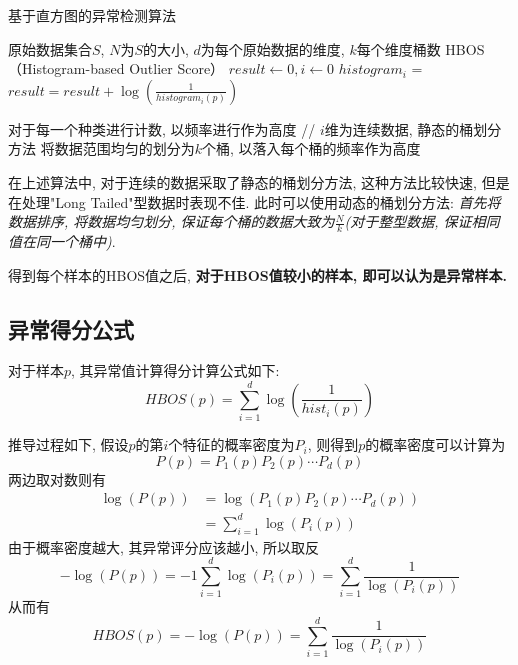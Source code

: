 \documentclass[12pt]{article}
\newcommand*{\heiti}{\CJKfamily{zhhei}}   %
\theoremstyle{definition}
\begin{document}
\begin{algorithm}[H]
  \caption{基于直方图的异常检测算法}
  \begin{algorithmic}[1]
    \Require 原始数据集合$S$, $N$为$S$的大小, $d$为每个原始数据的维度, $k$每个维度桶数
    \Ensure HBOS（Histogram-based Outlier Score）
    \State $result \gets 0, i \gets 0$
    \State $histogram_i$ = 
    \State $result = result + \log\left(\frac{1}{histogram_{i}(p)}\right)$
    \EndWhile
    \State {}
    \EndFunction

    \State 对于每一个种类进行计数, 以频率进行作为高度
    \Else
    \State // $i$维为连续数据, 静态的桶划分方法
    \State 将数据范围均匀的划分为$k$个桶, 以落入每个桶的频率作为高度
    \EndIf
    \State {}
    \EndFunction
  \end{algorithmic}
\end{algorithm}

在上述算法中, 对于连续的数据采取了静态的桶划分方法, 这种方法比较快速, 但是在处理"Long Tailed"型数据时表现不佳.
此时可以使用动态的桶划分方法: \textit{首先将数据排序, 将数据均匀划分, 保证每个桶的数据大致为$\frac{N}{k}$(对于整型数据, 保证相同值在同一个桶中)}\cite{goldstein2012histogram}.

得到每个样本的HBOS值之后, \textbf{{\heiti 对于HBOS值较小的样本, 即可以认为是异常样本.}}

\subsection{异常得分公式}

对于样本$p$, 其异常值计算得分计算公式如下\cite{goldstein2012histogram}:
$$
HBOS(p)=\sum_{i=1}^{d} \log \left(\frac{1}{hist_{i}(p)}\right)
$$

推导过程如下, 假设$p$的第$i$个特征的概率密度为$P_i$, 则得到$p$的概率密度可以计算为
$$
P(p)=P_{1}(p) P_{2}(p) \cdots P_{d}(p)
$$
两边取对数则有
$$
\begin{aligned} \log (P(p)) &=\log \left(P_{1}(p) P_{2}(p) \cdots P_{d}(p)\right) \\ &=\sum_{i=1}^{d} \log \left(P_{i}(p)\right) \end{aligned}
$$
由于概率密度越大, 其异常评分应该越小, 所以取反
$$
-\log (P(p))=-1 \sum_{i=1}^{d} \log \left(P_{i}(p)\right)=\sum_{i=1}^{d} \frac{1}{\log \left(P_{i}(p)\right)}
$$
从而有
$$
H B O S(p)=-\log (P(p))=\sum_{i=1}^{d} \frac{1}{\log \left(P_{i}(p)\right)}
$$


\appendix
\nocite{*}


\end{document}
